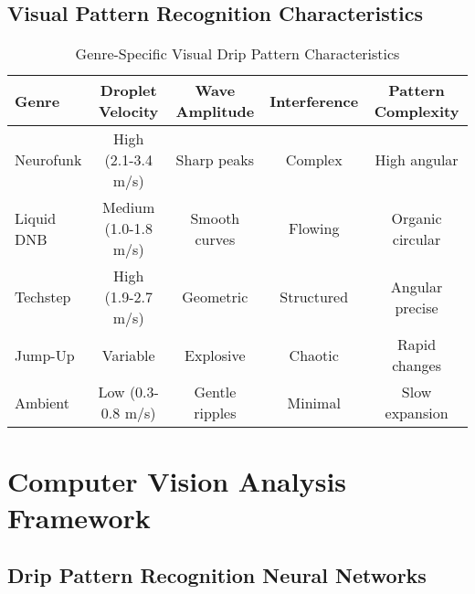 \documentclass[12pt,a4paper]{article}
\begin{document}
\subsection{Visual Pattern Recognition Characteristics}

\begin{table}[H]
\centering
\caption{Genre-Specific Visual Drip Pattern Characteristics}
\begin{tabular}{lcccc}
\toprule
Genre & Droplet Velocity & Wave Amplitude & Interference & Pattern Complexity \\
\midrule
Neurofunk & High (2.1-3.4 m/s) & Sharp peaks & Complex & High angular \\
Liquid DNB & Medium (1.0-1.8 m/s) & Smooth curves & Flowing & Organic circular \\
Techstep & High (1.9-2.7 m/s) & Geometric & Structured & Angular precise \\
Jump-Up & Variable & Explosive & Chaotic & Rapid changes \\
Ambient & Low (0.3-0.8 m/s) & Gentle ripples & Minimal & Slow expansion \\
\bottomrule
\end{tabular}
\end{table}

\section{Computer Vision Analysis Framework}

\subsection{Drip Pattern Recognition Neural Networks}
\end{document}
